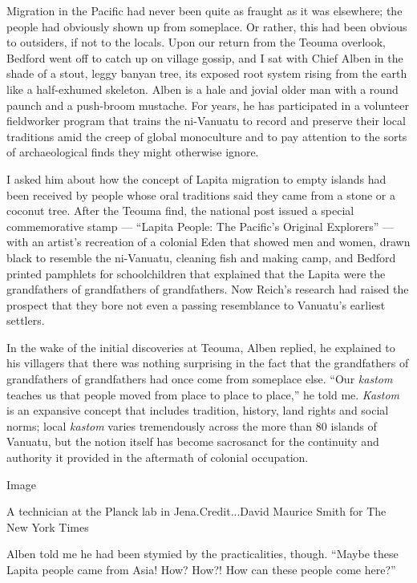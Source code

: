 Migration in the Pacific had never been quite as fraught as it was
elsewhere; the people had obviously shown up from someplace. Or rather,
this had been obvious to outsiders, if not to the locals. Upon our
return from the Teouma overlook, Bedford went off to catch up on village
gossip, and I sat with Chief Alben in the shade of a stout, leggy banyan
tree, its exposed root system rising from the earth like a half-exhumed
skeleton. Alben is a hale and jovial older man with a round paunch and a
push-broom mustache. For years, he has participated in a volunteer
fieldworker program that trains the ni-Vanuatu to record and preserve
their local traditions amid the creep of global monoculture and to pay
attention to the sorts of archaeological finds they might otherwise
ignore.

I asked him about how the concept of Lapita migration to empty islands
had been received by people whose oral traditions said they came from a
stone or a coconut tree. After the Teouma find, the national post issued
a special commemorative stamp --- ``Lapita People: The Pacific's
Original Explorers'' --- with an artist's recreation of a colonial Eden
that showed men and women, drawn black to resemble the ni-Vanuatu,
cleaning fish and making camp, and Bedford printed pamphlets for
schoolchildren that explained that the Lapita were the grandfathers of
grandfathers of grandfathers. Now Reich's research had raised the
prospect that they bore not even a passing resemblance to Vanuatu's
earliest settlers.

In the wake of the initial discoveries at Teouma, Alben replied, he
explained to his villagers that there was nothing surprising in the fact
that the grandfathers of grandfathers of grandfathers had once come from
someplace else. ``Our \emph{kastom} teaches us that people moved from
place to place to place,'' he told me. \emph{Kastom} is an expansive
concept that includes tradition, history, land rights and social norms;
local \emph{kastom} varies tremendously across the more than 80 islands
of Vanuatu, but the notion itself has become sacrosanct for the
continuity and authority it provided in the aftermath of colonial
occupation.

Image

A technician at the Planck lab in Jena.Credit...David Maurice Smith for
The New York Times

Alben told me he had been stymied by the practicalities, though. ``Maybe
these Lapita people came from Asia! How? How?! How can these people come
here?''

